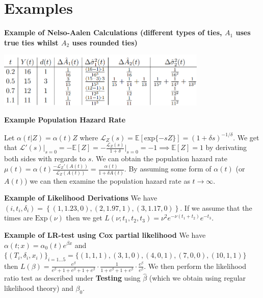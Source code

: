 \documentclass{article}
\begin{document}
\section*{Examples}

\textbf{Example of Nelso-Aalen Calculations (different types of ties, $A_1$ uses true ties whilst $A_2$ uses rounded ties)} 

\includegraphics[width=10cm]{surv_table.png}

\medskip

\textbf{Example Population Hazard Rate}

Let $\alpha(t|Z) = \alpha(t)Z$ where $\mathcal{L}_Z(s) = \mathbb{E}[\text{exp}\{-sZ\}] = (1+\delta s)^{-1/\delta}$. We get that $\mathcal{L}'(s)\big|_{s=0}  = -\mathbb{E}[Z] = -\frac{\mathcal{L}_Z(s)}{1+\delta }\big|_{s=0} = -1 \implies \mathbb{E}[Z] = 1$ by derivating both sides with regards to $s$. We can obtain the population hazard rate $\mu(t) = \alpha(t)\frac{-\mathcal{L}_Z'(A(t))}{\mathcal{L}_Z(A(t))} = \frac{\alpha(t)}{1 + \delta A(t)}$. By assuming some form of $\alpha(t)$ (or $A(t)$) we can then examine the population hazard rate as $t \to \infty$. 

\medskip

\textbf{Example of Likelihood Derivations} We have $(i, t_i, \delta_i) = \left\{(1,1.23,0),(2,1.97,1),(3, 1.17, 0)\right\}$. If we assume that the times are $\text{Exp}(\nu)$ then we get $L(\nu; t_1, t_2, t_3) = \nu^2 e^{-\nu(t_1 + t_2)} e^{-t_3}$. 

\medskip

\textbf{Example of LR-test using Cox partial likelihood}
We have $\alpha(t; x) = \alpha_0(t)e^{\beta x}$ and 
$\{(T_i, \delta_i, x_i)\}_{i=1...5} = \{(1, 1, 1),(3, 1, 0),(4, 0, 1),(7, 0, 0),(10, 1, 1) \}$ then $L(\beta) = \frac{e^{\beta}}{e^{\beta}+1+e^{\beta}+1+e^{\beta}} \cdot \frac{1}{1+e^{\beta}+1+e^{\beta}} \cdot \frac{e^{\beta}}{e^{\beta}}$. We then perform the likelihood ratio test as described under \textbf{Testing} using $\hat\beta$ (which we obtain using regular likelihood theory) and $\beta_0$. 
\end{document}
